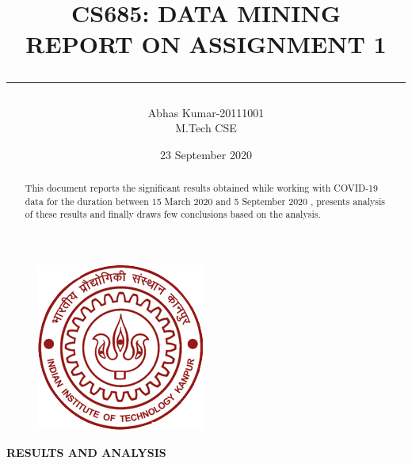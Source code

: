 \documentclass[12pt]{article}
\title{%
\textbf{CS685: DATA MINING\\
REPORT ON ASSIGNMENT 1\\}
\rule{\textwidth}{2pt}
}
\author{%
Abhas Kumar-20111001\\
M.Tech CSE\\
}
\date{23 September 2020}
\begin{document}
\begin{figure}[t]
\centering
\includegraphics[scale=0.4]{IITK.png}
\end{figure}

\maketitle
\begin{abstract}
\begin{center}
This document reports the significant results obtained while working with COVID-19 data for the duration between 15 March 2020 and 5 September 2020 , presents analysis of these results and finally draws few conclusions based on the analysis.
\end{center} 
\end{abstract}
\textbf{RESULTS AND ANALYSIS}
\end{document}
